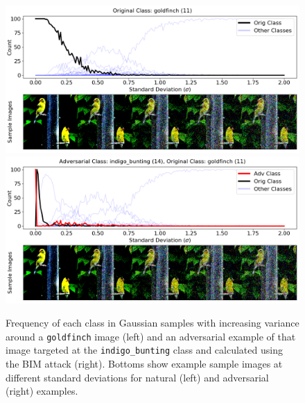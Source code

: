 \begin{frame}
 \begin{figure}[ht]
 \centering
 \includegraphics[width = .49\textwidth]{./c3_figures/ILSVRC2012_val_00001274-vgg16-sampling.png}
 \includegraphics[width = .49\textwidth]{./c3_figures/IMNET-class-11-vgg16-BIM-48-attack_data-023.png}

 \caption{Frequency of each class in Gaussian samples with increasing variance around a \texttt{goldfinch} image (left) and an adversarial example of that image targeted at the \texttt{indigo\_bunting} class and calculated using the BIM attack (right). Bottoms show example sample images at different standard deviations for natural (left) and adversarial (right) examples.}
 \label{fig:imagenet_adv}
 \end{figure}
\end{frame}



